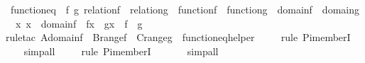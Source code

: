 \begin{isabellebody}
%
\endisatagproof
{\isafoldproof}%
%
\isadelimproof
\isanewline
%
\endisadelimproof
\isanewline
{}\isamarkupfalse%
\ function{\isacharunderscore}{\kern0pt}eq\ {\isacharcolon}{\kern0pt}\ {\isachardoublequoteopen}{\isasymAnd}f\ g{\isachardot}{\kern0pt}\ relation{\isacharparenleft}{\kern0pt}f{\isacharparenright}{\kern0pt}\ {\isasymLongrightarrow}\ relation{\isacharparenleft}{\kern0pt}g{\isacharparenright}{\kern0pt}\ {\isasymLongrightarrow}\ function{\isacharparenleft}{\kern0pt}f{\isacharparenright}{\kern0pt}\ {\isasymLongrightarrow}\ function{\isacharparenleft}{\kern0pt}g{\isacharparenright}{\kern0pt}\ {\isasymLongrightarrow}\ domain{\isacharparenleft}{\kern0pt}f{\isacharparenright}{\kern0pt}\ {\isacharequal}{\kern0pt}\ domain{\isacharparenleft}{\kern0pt}g{\isacharparenright}{\kern0pt}\ {\isasymLongrightarrow}\ {\isacharparenleft}{\kern0pt}{\isasymAnd}x{\isachardot}{\kern0pt}\ x\ {\isasymin}\ domain{\isacharparenleft}{\kern0pt}f{\isacharparenright}{\kern0pt}\ {\isasymLongrightarrow}\ f{\isacharbackquote}{\kern0pt}x\ {\isacharequal}{\kern0pt}\ g{\isacharbackquote}{\kern0pt}x{\isacharparenright}{\kern0pt}\ {\isasymLongrightarrow}\ f\ {\isacharequal}{\kern0pt}\ g{\isachardoublequoteclose}\ \isanewline
%
\isadelimproof
\ \ %
\endisadelimproof
%
\isatagproof
{}\isamarkupfalse%
{\isacharparenleft}{\kern0pt}rule{\isacharunderscore}{\kern0pt}tac\ A{\isacharequal}{\kern0pt}{\isachardoublequoteopen}domain{\isacharparenleft}{\kern0pt}f{\isacharparenright}{\kern0pt}{\isachardoublequoteclose}\ \ B{\isacharequal}{\kern0pt}{\isachardoublequoteopen}range{\isacharparenleft}{\kern0pt}f{\isacharparenright}{\kern0pt}{\isachardoublequoteclose}\ \ C{\isacharequal}{\kern0pt}{\isachardoublequoteopen}range{\isacharparenleft}{\kern0pt}g{\isacharparenright}{\kern0pt}{\isachardoublequoteclose}\ \ function{\isacharunderscore}{\kern0pt}eq{\isacharunderscore}{\kern0pt}helper{\isacharparenright}{\kern0pt}\isanewline
\ \ \ \ \isamarkupfalse%
{\isacharparenleft}{\kern0pt}rule\ Pi{\isacharunderscore}{\kern0pt}memberI{\isacharparenright}{\kern0pt}\isanewline
\ \ \isamarkupfalse%
\ simp{\isacharunderscore}{\kern0pt}all\isanewline
\ \ \ \ \isamarkupfalse%
{\isacharparenleft}{\kern0pt}rule\ Pi{\isacharunderscore}{\kern0pt}memberI{\isacharparenright}{\kern0pt}\isanewline
\ \ \ \ \ \isamarkupfalse%
\ simp{\isacharunderscore}{\kern0pt}all\isanewline
\ \ \isamarkupfalse%
%
\endisatagproof
{\isafoldproof}%
%
\isadelimproof
\isanewline

\end{isabellebody}
